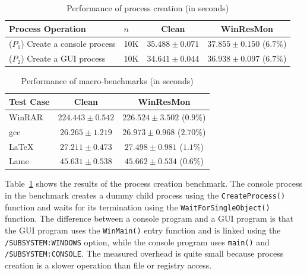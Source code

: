 \begin{table}
\small
\centering
\begin{tabular}{|l|l|c|c|}
\hline
Process Operation & $n$ & Clean & WinResMon \\
\hline
($P_1$) Create a console process & 10K & $35.488 \pm 0.071$ & $37.855 \pm 0.150$ ($6.7\%$) \\
($P_2$) Create a GUI process     & 10K & $34.641 \pm 0.044$ & $36.938 \pm 0.097$ ($6.7\%$) \\
\hline
\end{tabular}
\caption{Performance of process creation (in seconds)}
\label{perf-proc}
\end{table}

\begin{table}
\small
\centering
\begin{tabular}{|l|c|c|}
\hline
Test Case & Clean & WinResMon \\
\hline
WinRAR   & $224.443 \pm 0.542$ & $226.524 \pm 3.502$ ($0.9\%$) \\
gcc      & $26.265 \pm 1.219$  & $26.973 \pm 0.968$ ($2.70\%$) \\
\LaTeX{} & $27.211 \pm 0.473$  & $27.498 \pm 0.981$ ($1.1\%$) \\
Lame     & $45.631 \pm 0.538$  & $45.662 \pm 0.534$ ($0.6\%$) \\
\hline
\end{tabular}
\caption{Performance of macro-benchmarks (in seconds)}
\label{perf-macro}
\end{table}

Table~\ref{perf-proc} shows the results of the process creation benchmark. The
console process in the benchmark creates a dummy child process using the
{\small\tt CreateProcess()} function and waits for its termination using the
{\small\tt WaitForSingleObject()} function.  The difference between a console
program and a GUI program is that the GUI program uses the {\small\tt WinMain()}
entry function and is linked using the {\small\tt /SUBSYSTEM:WINDOWS} option, while
the console program uses {\small\tt main()} and {\small\tt /SUBSYSTEM:CONSOLE}.  The
measured overhead is quite small because process creation is a slower
operation than file or registry access.

